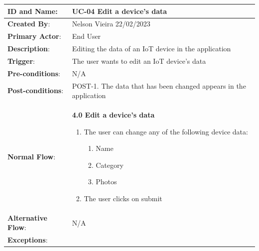 \begin{table}[H]
    \centering
    \begin{adjustbox}{width=1.1\textwidth,center=\textwidth}
        \begin{tabular}{|m{4cm}|m{12cm}|}
            \hline
            \textbf{ID and Name}: & UC-04 Edit a device's data \\
            \hline
            \textbf{Created By}: & Nelson Vieira 22/02/2023 \\
            \hline
            \textbf{Primary Actor}: & End User \\
            \hline
            \textbf{Description}: & Editing the data of an IoT device in the application \\
            \hline
            \textbf{Trigger}: & The user wants to edit an IoT device's data \\
            \hline
            \textbf{Pre-conditions}: & N/A \\
            \hline
            \textbf{Post-conditions}: & POST-1. The data that has been changed appears in the application \\
            \hline
            \textbf{Normal Flow}: & \textbf{4.0 Edit a device's data}
            \begin{enumerate}
                \item The user can change any of the following device data:
                \begin{enumerate}
                    \item Name
                    \item Category
                    \item Photos
                \end{enumerate}
                \item The user clicks on submit
            \end{enumerate} \\
            \hline
            \textbf{Alternative Flow}: & N/A \\
            \hline
            \textbf{Exceptions}: &

\end{tabular}
\end{adjustbox}
\end{table}
